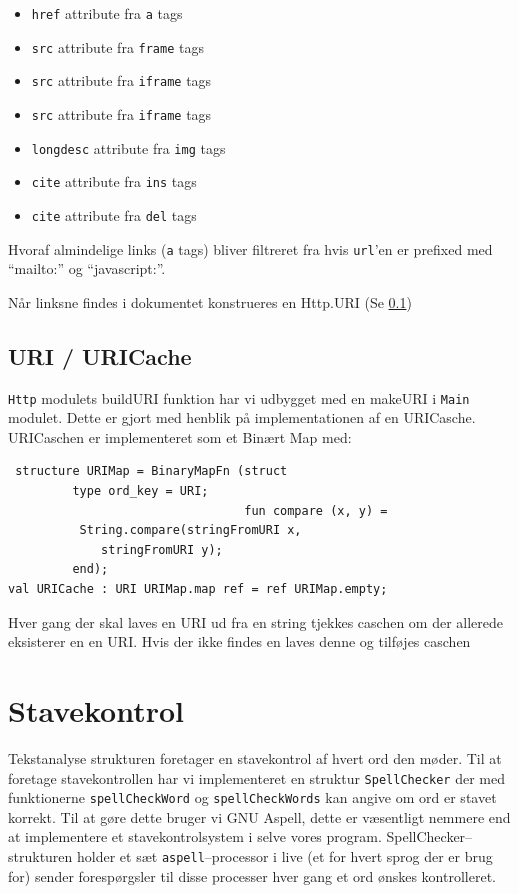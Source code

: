 \documentclass[a4paper,oneside,article]{memoir}
\begin{document}
\begin{itemize}
 \item \texttt{href} attribute fra \texttt{a} tags
 \item \texttt{src} attribute fra \texttt{frame} tags
 \item \texttt{src} attribute fra \texttt{iframe} tags
 \item \texttt{src} attribute fra \texttt{iframe} tags
 \item \texttt{longdesc} attribute fra \texttt{img} tags
 \item \texttt{cite} attribute fra \texttt{ins} tags
 \item \texttt{cite} attribute fra \texttt{del} tags
\end{itemize}

Hvoraf almindelige links (\texttt{a} tags) bliver filtreret fra hvis
\texttt{url}'en er prefixed med ``mailto:'' og ``javascript:''.

 Når linksne findes i dokumentet konstrueres en Http.URI (Se \ref{URICache})

\subsection{URI / URICache}
\label{URICache}

\texttt{Http} modulets buildURI funktion har vi udbygget med en
makeURI i \texttt{Main} modulet. Dette er gjort med henblik på
implementationen af en URICasche. URICaschen er implementeret som et
Binært Map med:

\begin{lstlisting}
 structure URIMap = BinaryMapFn (struct 
         type ord_key = URI; 
                                 fun compare (x, y) = 
          String.compare(stringFromURI x, 
             stringFromURI y);
         end);
val URICache : URI URIMap.map ref = ref URIMap.empty;
\end{lstlisting}

Hver gang der skal laves en URI ud fra en string tjekkes caschen om
der allerede eksisterer en en URI. Hvis der ikke findes en laves denne
og tilføjes caschen

\section{Stavekontrol}
\label{Spellchecker}

Tekstanalyse strukturen foretager en stavekontrol af hvert ord den
møder. Til at foretage stavekontrollen har vi implementeret en
struktur \texttt{SpellChecker} der med funktionerne
\texttt{spellCheckWord} og \texttt{spellCheckWords} kan angive om ord
er stavet korrekt. Til at gøre dette bruger vi GNU Aspell, dette er
væsentligt nemmere end at implementere et stavekontrolsystem i selve
vores program. SpellChecker--strukturen holder et sæt
\texttt{aspell}--processor i live (et for hvert sprog der er brug for)
sender forespørgsler til disse processer hver gang et ord ønskes
kontrolleret.
\end{document}
